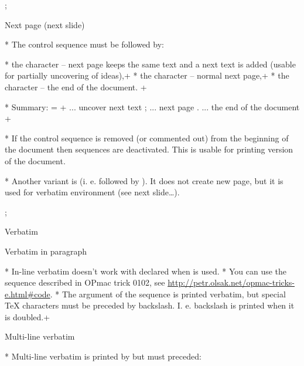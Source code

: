 \pg; %

\sec Next page (next slide)

* The control sequence \code{\\pg} must be followed by:

\begitems
* the character \frame{\strut\code{+}} -- next page keeps the same text
  and a next text is added (usable for partially uncovering of ideas),\pg+ 
* the character \frame{\strut\code{;}} -- normal next page,\pg+
* the character  -- the end of the document.
\enditems
\pg+

* Summary:
\pg=\begtt
\pg+    ... uncover next text
\pg;    ... next page
\pg.    ... the end of the document
\endtt
\pg+

* If the control sequence \code{\\slideshow} is removed (or commented out)
  from the beginning of the document then \code{\\pg+} sequences are deactivated.
  This is usable for printing version of the document.

* Another variant is \code{\\pg=} (i. e. \code{\\pg} followed by
  \frame{\strut\code{=}}). It does not create new page, but it is used for verbatim
  environment (see next slide\dots). 

\pg; %

\sec Verbatim

\secc Verbatim in paragraph

* In-line verbatim doesn't work with declared \code{\\activettchar} when
  \code{\\slideshow} is used.
* You can use the \code{\\code} sequence described in OPmac trick 0102,\nl
  see \url{http://petr.olsak.net/opmac-tricks-e.html\#code}.
* The argument of the \code{\\code} sequence is printed verbatim, but
  special \TeX{} characters must be preceded by backslash. I. e. backslash is
  printed when it is doubled.\pg+

\secc Multi-line verbatim

* Multi-line verbatim is printed by  but \code{\\pg=}
  must preceded:

